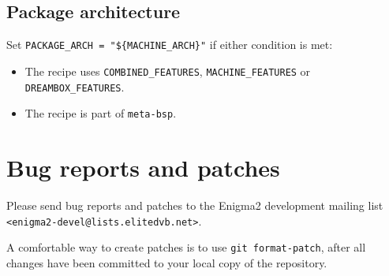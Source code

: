 \documentclass[a4paper]{article}
\newcommand{\shell}[1]{\texttt{\small #1}}
\begin{document}
  \subsection {Package architecture}
    Set \shell{PACKAGE\_ARCH = "\$\{MACHINE\_ARCH\}"} if either condition is met:
    \begin{itemize}
      \item The recipe uses \shell{COMBINED\_FEATURES}, \shell{MACHINE\_FEATURES} or \shell{DREAMBOX\_FEATURES}.
      \item The recipe is part of \shell{meta-bsp}.
    \end{itemize}

\section{Bug reports and patches}

  Please send bug reports and patches to the Enigma2 development mailing list \shell{<enigma2-devel@lists.elitedvb.net>}.

  A comfortable way to create patches is to use \shell{git format-patch}, after all changes have been committed to your
  local copy of the repository.
\end{document}
